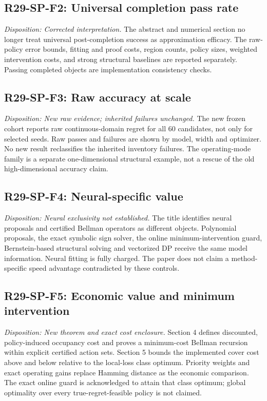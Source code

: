 \subsection{R29-SP-F2: Universal completion pass rate}
\textit{Disposition: Corrected interpretation.} The abstract and numerical section no longer treat universal post-completion success as approximation efficacy. The raw-policy error bounds, fitting and proof costs, region counts, policy sizes, weighted intervention costs, and strong structural baselines are reported separately. Passing completed objects are implementation consistency checks.
\subsection{R29-SP-F3: Raw accuracy at scale}
\textit{Disposition: New raw evidence; inherited failures unchanged.} The new frozen cohort reports raw continuous-domain regret for all 60 candidates, not only for selected seeds. Raw passes and failures are shown by model, width and optimizer. No new result reclassifies the inherited inventory failures. The operating-mode family is a separate one-dimensional structural example, not a rescue of the old high-dimensional accuracy claim.
\subsection{R29-SP-F4: Neural-specific value}
\textit{Disposition: Neural exclusivity not established.} The title identifies neural proposals and certified Bellman operators as different objects. Polynomial proposals, the exact symbolic sign solver, the online minimum-intervention guard, Bernstein-based structural solving and vectorized DP receive the same model information. Neural fitting is fully charged. The paper does not claim a method-specific speed advantage contradicted by these controls.
\subsection{R29-SP-F5: Economic value and minimum intervention}
\textit{Disposition: New theorem and exact cost enclosure.} Section 4 defines discounted, policy-induced occupancy cost and proves a minimum-cost Bellman recursion within explicit certified action sets. Section 5 bounds the implemented cover cost above and below relative to the local-loss class optimum. Priority weights and exact operating gains replace Hamming distance as the economic comparison. The exact online guard is acknowledged to attain that class optimum; global optimality over every true-regret-feasible policy is not claimed.
